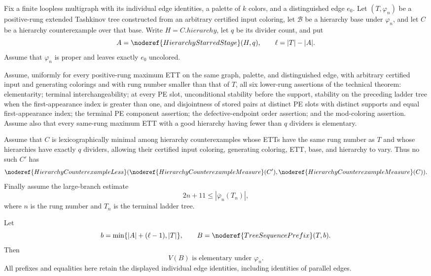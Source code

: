\begin{lemma}
Fix a finite loopless multigraph with its individual edge identities, a
palette of $k$ colors, and a distinguished edge $e_0$.  Let
$(T,\varphi_n)$ be a positive-rung extended Tashkinov tree constructed
from an arbitrary certified input coloring, let $\mathcal B$ be a
hierarchy base under $\varphi_n$, and let $C$ be a hierarchy
counterexample over that base.  Write $H=C.\mathit{hierarchy}$, let $q$
be its divider count, and put
\[
 A=\noderef{HierarchyStarredStage}(H,q),\qquad
 \ell=|T|-|A|.
\]
Assume that $\varphi_n$ is proper and leaves exactly $e_0$ uncolored.

Assume, uniformly for every positive-rung maximum ETT on the same graph,
palette, and distinguished edge, with arbitrary certified input and
generating colorings and with rung number smaller than that of $T$, all
six lower-rung assertions of the technical theorem: elementarity;
terminal interchangeability; at every PE slot, unconditional stability
before the support, stability on the preceding ladder tree when the
first-appearance index is greater than one, and disjointness of stored
pairs at distinct PE slots with distinct supports and equal
first-appearance index; the terminal PE component assertion; the
defective-endpoint order assertion; and the mod-coloring assertion.
Assume also that every same-rung maximum ETT with a good hierarchy having
fewer than $q$ dividers is elementary.

Assume that $C$ is lexicographically minimal among hierarchy
counterexamples whose ETTs have the same rung number as $T$ and whose
hierarchies have exactly $q$ dividers, allowing their certified input
coloring, generating coloring, ETT, base, and hierarchy to vary.  Thus no
such $C'$ has
\[
 \noderef{HierarchyCounterexampleLess}
   (\noderef{HierarchyCounterexampleMeasure}(C'),
    \noderef{HierarchyCounterexampleMeasure}(C)).
\]
Finally assume the large-branch estimate
\[
 2n+11\leq |\overline\varphi_n(T_n)|,
\]
where $n$ is the rung number and $T_n$ is the terminal ladder tree.

Let
\[
 b=\min\{|A|+(\ell-1),|T|\},\qquad
 B=\noderef{TreeSequencePrefix}(T,b).
\]
Then
\[
        V(B)\text{ is elementary under }\varphi_n.             \tag{6.6}
\]
All prefixes and equalities here retain the displayed individual edge
identities, including identities of parallel edges.
\end{lemma}
